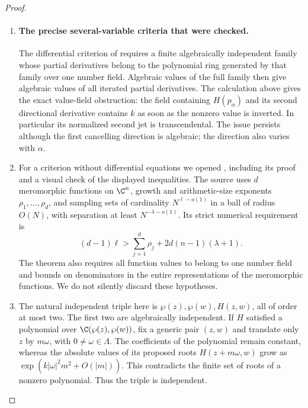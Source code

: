 \begin{proof}
\begin{enumerate}[label=\arabic*.,leftmargin=*]
\item \paragraph{The precise several-variable criteria that were checked.}
The differential criterion of
\citet[Theorems 3.6 and 3.7]{waldschmidt2009auxiliary}
requires a finite algebraically independent family whose
partial derivatives belong to the polynomial ring generated
by that family over one number field. Algebraic values of
the full family then give algebraic values of all iterated
partial derivatives. The calculation above gives the exact value-field obstruction:
the field containing $H(p_\alpha)$ and its second directional
derivative contains $k$ as soon as the nonzero value is inverted.
In particular its normalized second jet is transcendental. The issue persists
although the first cancelling direction is algebraic; the
direction also varies with $\alpha$.

\item For a criterion without differential equations we opened
\citet[Theorem 1, p.~24]{waldschmidt1975dimension}, including
its proof and a visual check of the displayed inequalities.
The source uses $d$ meromorphic functions on $\C^n$, growth and
arithmetic-size exponents $\rho_1,\ldots,\rho_d$, and sampling
sets of cardinality $N^{\ell-o(1)}$ in a ball of radius $O(N)$,
with separation at least $N^{-\lambda-o(1)}$. Its strict numerical
requirement is
\begin{equation}\label{ari:eq:cc-rankcriterion}
 (d-1)\ell>\sum_{j=1}^d\rho_j
                     +2d(n-1)(\lambda+1).
\end{equation}
The theorem also requires all function values to belong to
one number field and bounds on denominators in the entire
representations of the meromorphic functions. We do not
silently discard these hypotheses.

\item The natural independent triple here is
$\wp(z),\wp(w),H(z,w)$, all of order at most two.
The first two are algebraically independent. If $H$ satisfied
a polynomial over $\C(\wp(z),\wp(w))$, fix a generic pair
$(z,w)$ and translate only $z$ by $m\omega$, with
$0\ne\omega\in\Lambda$. The coefficients of the polynomial
remain constant, whereas the absolute values of its proposed
roots $H(z+m\omega,w)$ grow as
$\exp(k|\omega|^2m^2+O(|m|))$. This contradicts the finite
set of roots of a nonzero polynomial. Thus the triple is
independent.


\end{enumerate}
\end{proof}
